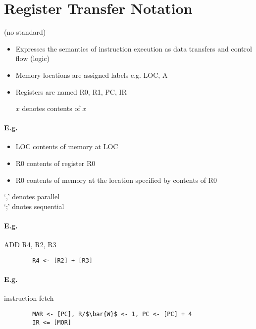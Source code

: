   \section{Register Transfer Notation}
    (no standard)
    \begin{itemize}
      \item Expresses the semantics of instruction execution as data transfers
      and control flow (logic)
      \item Memory locations are assigned labels e.g. LOC, A
      \item Registers are named R0, R1, PC, IR
      \item [$x$] denotes contents of $x$
    \end{itemize}
    \paragraph{E.g.}
    \begin{itemize}
      \item \lbrack{}LOC\rbrack{} contents of memory at LOC
      \item \lbrack{}R0\rbrack{} contents of register R0
      \item \lbrack\lbrack{}R0\rbrack\rbrack{} contents of memory at the location specified by contents of
        R0
    \end{itemize}
    `,' denotes parallel\\
    `;' dnotes sequential

    \paragraph{E.g.} ADD R4, R2, R3
      \begin{lstlisting}
        R4 <- [R2] + [R3]
      \end{lstlisting}

    \paragraph{E.g.} instruction fetch
      \begin{lstlisting}
        MAR <- [PC], R/$\bar{W}$ <- 1, PC <- [PC] + 4
        IR <= [MOR]
      \end{lstlisting}
